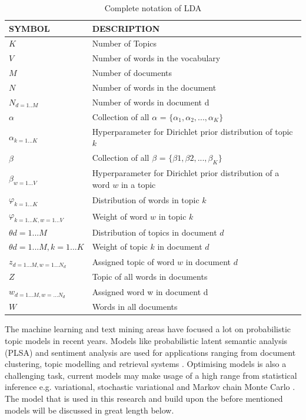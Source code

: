 \begin{table}[h]
\centering
 \begin{tabular}{l l} 
 \hline
 SYMBOL & DESCRIPTION \\ 
 \hline
 $K$ & Number of Topics \\  
 $V$ & Number of words in the vocabulary \\
 $M$ & Number of documents \\
 $N$ & Number of words in the document \\
 $N_{d=1..M}$ & Number of words in document d\\
 $\alpha$ & Collection of all $\alpha$ = $ \{ \alpha_{1},\alpha_{2}, ... , \alpha_{K}\}$ \\
 $\alpha_{k=1...K}$ & Hyperparameter for Dirichlet prior distribution of topic $k$ \\
 $\beta$ &  Collection of all $\beta$ = $\{\beta{1},\beta{2}, ... , \beta_{K}\}$ \\
 $\beta_{w=1...V}$ & Hyperparameter for Dirichlet prior distribution of a word $w$ in a topic \\
 $\varphi_{k=1...K}$ & Distribution of words in topic $k$ \\
 $\varphi_{k=1...K, w=1...V}$ & Weight of  word $w$ in topic $k$  \\
 $\theta{d=1...M}$ & Distribution of topics in document $d$  \\
 $\theta{d=1...M, k=1...K}$ & Weight of  topic $k$ in document $d$ \\
 $z_{d=1...M, w=1...N_d}$ & Assigned topic of word $w$ in document $d$\\
 $Z$ & Topic of all words in documents \\
 $w_{d=1...M, w=...N_d}$ & Assigned word w in document d \\ 
 $W$ & Words in all documents \\ 

 \hline
 \end{tabular}
\caption{Complete notation of LDA}
\label{tab:table1}
\end{table}

The machine learning and text mining areas have focused a lot on probabilistic topic models in recent years. Models like probabilistic latent semantic analysis (PLSA) and sentiment analysis are used for applications ranging from document clustering, topic modelling and retrieval systems \cite{Lu2011InvestigatingLDA}. Optimising models is also a challenging task, current models may make usage of a high range from statistical inference e.g. variational, stochastic variational and Markov chain Monte Carlo \cite{Hoffman2016MarkovModels}. The model that is used in this research and build upon the before mentioned models will be discussed in great length below.

